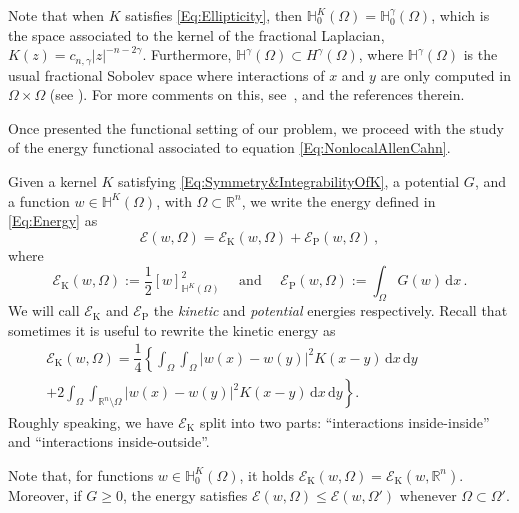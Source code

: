 \documentclass[12pt,reqno]{amsart}
\theoremstyle{definition}
\theoremstyle{remark}
\newcommand{\con}[1]{\mathbb{#1}}
\newcommand{\R}{\con{R}} %
\renewcommand{\H}{\con{H}}
\newcommand{\ecal}{\mathcal{E}}
\newcommand{\s}{\gamma}
\renewcommand{\d}{\,\mathrm{d}} %
\numberwithin{equation}{section}
\begin{document}
Note that when $K$ satisfies \eqref{Eq:Ellipticity}, then $\H^K_0 (\Omega) = \H^\s_0 (\Omega)$,
which is the space associated to the kernel of the fractional Laplacian, $K(z) = c_{n,\s} |z|^{-n-2\s}$.
Furthermore, $\H^\s(\Omega) \subset H^\s(\Omega)$, where $\H^\s(\Omega)$ is the usual fractional Sobolev space where interactions of $x$ and $y$ are only computed in $\Omega \times \Omega$ (see \cite{HitchhikerGuide}).  For more comments on this, see~\cite{CozziPassalacqua}, and the references therein.

Once presented the functional setting of our problem, we proceed with the study of the energy functional associated to equation \eqref{Eq:NonlocalAllenCahn}. 


Given a kernel $K$ satisfying \eqref{Eq:Symmetry&IntegrabilityOfK}, a potential $G$, and a function $w\in \H^K(\Omega)$, with $\Omega\subset \R^{n}$, we write the energy defined in \eqref{Eq:Energy} as
$$
\ecal(w, \Omega) = \ecal_\mathrm{K}(w,\Omega) + \ecal_\mathrm{P}(w,\Omega)\,,
$$
where
$$
\ecal_\mathrm{K}(w, \Omega) := \dfrac{1}{2} [w]^2_{\H^K(\Omega)} \quad \text{ and } \quad  \ecal_\mathrm{P}(w, \Omega) := \int_{\Omega} G(w) \d x
\,.
$$
We will call $\ecal_\mathrm{K}$ and $\ecal_\mathrm{P}$ the \emph{kinetic} and \emph{potential} energies respectively. Recall that sometimes it is useful to rewrite the kinetic energy as
\begin{equation}
\label{Eq:KineticEnergyInteractions}
\begin{split}
\ecal_\mathrm{K}(w, \Omega) = \dfrac{1}{4} \left \{ \int_\Omega \int_\Omega |w(x) - w(y)|^2 K(x-y) \d x \d y \right. \qquad \qquad \\
+\left. 2 \int_\Omega \int_{\R^n \setminus \Omega} |w(x) - w(y)|^2 K(x-y) \d x \d y \right \}.
\end{split}	
\end{equation}
Roughly speaking, we have $\ecal_\mathrm{K}$ split into two parts: ``interactions inside-inside'' and ``interactions inside-outside''.

Note that, for functions $w\in \H^K_0(\Omega)$, it holds $\ecal_\mathrm{K}(w,\Omega) = \ecal_\mathrm{K}(w,\R^n)$. Moreover, if $G\geq 0$, the energy satisfies $\ecal(w, \Omega) \leq \ecal(w, \Omega')$  whenever $ \Omega \subset \Omega'$.
\end{document}
